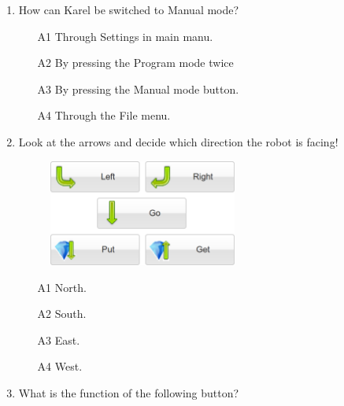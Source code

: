 \documentclass[article,A4,12pt]{llncs}
\begin{document}
\begin{enumerate}
\item How can Karel be switched to Manual mode?
\begin{enumerate}
\item[A1] Through Settings in main manu.
\item[A2] By pressing the Program mode twice
\item[A3] By pressing the Manual mode button.
\item[A4] Through the File menu.
\end{enumerate}
\item Look at  the arrows and decide which direction the robot is facing!
\begin{figure}[!ht]
\begin{center}
\includegraphics[width=6.2cm]{img/buttons-all-3.png}
\end{center}
\end{figure}
\begin{enumerate}
\item[A1] North.
\item[A2] South.
\item[A3] East.
\item[A4] West.
\end{enumerate}
\item What is the function of the following button?


\end{enumerate}
\end{document}
